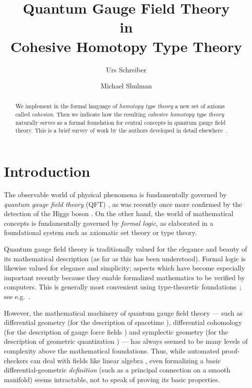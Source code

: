 \documentclass[copyright]{eptcs}
\title{Quantum Gauge Field Theory \\ in  \\ Cohesive Homotopy Type Theory}
\author{
  Urs Schreiber
  \institute{University Nijmegen\\ The Netherlands}
  \email{urs.schreiber@gmail.com}
  \and
  Michael Shulman
  \institute{University of San Diego\\
    San Diego, CA, USA}
  \email{shulman@sandiego.edu}}
\begin{document}
\maketitle

\begin{abstract}
  We implement in the formal language of \emph{homotopy type theory} a new set of axioms called \emph{cohesion}.
  Then we indicate how the resulting \emph{cohesive homotopy type theory} naturally serves
  as a formal foundation for central concepts in quantum gauge field theory.
  This is a brief survey of work by the authors developed in detail elsewhere~\cite{ShulmanCohesion,SchreiberCohesion}.
\end{abstract}



\section{Introduction}
\label{sec:introduction}

The observable world of physical phenomena is fundamentally governed by
\emph{quantum gauge field theory} (QFT) \cite{Deligne},
as was recently once more confirmed by the
detection \cite{CERNPressRelease} of the Higgs boson \cite{Bernstein}.
On the other hand, the world of mathematical concepts
is fundamentally governed by \emph{formal logic}, as elaborated in a foundational system such as axiomatic set theory or type theory.

Quantum gauge field theory is traditionally valued for the elegance and beauty
of its mathematical description (as far as this has been understood).
Formal logic is likewise valued for elegance and simplicity; aspects which have become especially important recently because they enable formalized mathematics to be verified by computers.
This is generally most convenient using type-theoretic foundations~\cite{MartinLoef}; see e.g.~\cite{Coquand}.

However, the mathematical machinery of quantum gauge field theory ---
such as differential geometry
(for the description of spacetime \cite{GS}),
differential cohomology
(for the description of gauge force fields \cite{HopkinsSinger, Freed})
and symplectic geometry
(for the description of geometric quantization \cite{Brylinski})
--- has always seemed to be many levels of complexity above the mathematical foundations.
Thus, while automated proof-checkers
can deal with fields like linear algebra \cite{Coquand},
even formalizing a basic differential-geometric \emph{definition} (such as a principal connection on a smooth manifold) seems intractable,
not to speak of proving its basic properties.
\end{document}
